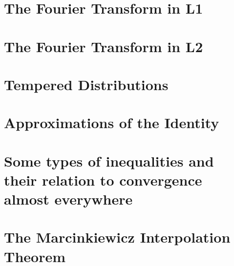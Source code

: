 \lipsum[10]

\section{The Fourier Transform in L1}
  
\section{The Fourier Transform in L2}
  
\section{Tempered Distributions}
  
\section{Approximations of the Identity}
  
\section{Some types of inequalities and their relation to convergence almost everywhere}
  
\section{The Marcinkiewicz Interpolation Theorem}
  
